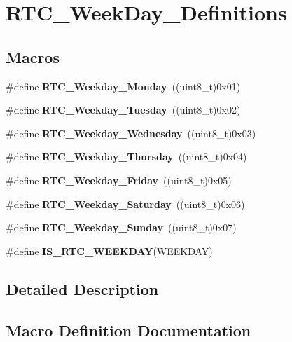 \section{R\+T\+C\+\_\+\+Week\+Day\+\_\+\+Definitions}
\label{group__RTC__WeekDay__Definitions}
\subsection*{Macros}
\begin{DoxyCompactItemize}
\item 
\#define \textbf{ R\+T\+C\+\_\+\+Weekday\+\_\+\+Monday}~((uint8\+\_\+t)0x01)
\item 
\#define \textbf{ R\+T\+C\+\_\+\+Weekday\+\_\+\+Tuesday}~((uint8\+\_\+t)0x02)
\item 
\#define \textbf{ R\+T\+C\+\_\+\+Weekday\+\_\+\+Wednesday}~((uint8\+\_\+t)0x03)
\item 
\#define \textbf{ R\+T\+C\+\_\+\+Weekday\+\_\+\+Thursday}~((uint8\+\_\+t)0x04)
\item 
\#define \textbf{ R\+T\+C\+\_\+\+Weekday\+\_\+\+Friday}~((uint8\+\_\+t)0x05)
\item 
\#define \textbf{ R\+T\+C\+\_\+\+Weekday\+\_\+\+Saturday}~((uint8\+\_\+t)0x06)
\item 
\#define \textbf{ R\+T\+C\+\_\+\+Weekday\+\_\+\+Sunday}~((uint8\+\_\+t)0x07)
\item 
\#define \textbf{ I\+S\+\_\+\+R\+T\+C\+\_\+\+W\+E\+E\+K\+D\+AY}(W\+E\+E\+K\+D\+AY)
\end{DoxyCompactItemize}


\subsection{Detailed Description}


\subsection{Macro Definition Documentation}
\mbox{\label{group__RTC__WeekDay__Definitions_gaf17712ffb0834287f23c19235d53c7ec}} 
